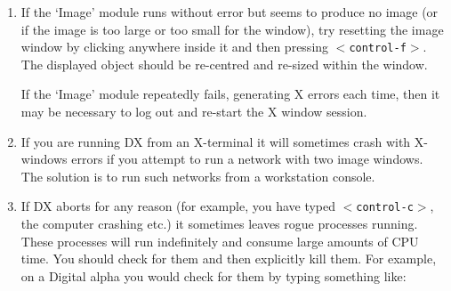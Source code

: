\begin{enumerate}
   where {\it x}\, is the amount of memory to be used, in Mb. Thus, for
   example, to specify a maximum of 200Mb you would type:

  \begin{quote}
   {\tt dx -memory 200}
  \end{quote}

   The most suitable value depends on the capabilities and configuration
   of your system. The following (possibly contradictory) criteria
   apply:

  \begin{itemize}

    \item try to allocate at least two or three times the total size
     of your data set,

    \item but do not allocate more than the total amount of swap space
     on your machine\footnotemark[\value{swapfoot}],

    \item finally (but not least), other users will appreciate your 
     setting a small value!

  \end{itemize}

   Appendix A, {\it Using Data Explorer: Some Useful Hints}, in the
   IBM {\it User's Guide}\cite{USERG} includes a section, {\it Memory
   Use}, which contains useful hints on reducing the amount of memory
   needed by DX.

  \item If the `Image' module runs without error but seems to produce no
   image (or if the image is too large or too small for the window), try
   resetting the image window by clicking anywhere inside it and then 
   pressing {\tt $<$control-f$>$}. The displayed object should be
   re-centred and re-sized within the window.

   If the `Image' module repeatedly fails, generating X errors each time, 
   then it may be necessary to log out and re-start the X window session.

  \item If you are running DX from an X-terminal it will sometimes
   crash with X-windows errors if you attempt to run a network with
   two image windows. The solution is to run such networks from a
   workstation console.

  \item If DX aborts for any reason (for example, you have typed
   {\tt $<$control-c$>$}, the computer crashing etc.) it sometimes leaves
   rogue processes running. These processes will run indefinitely and
   consume large amounts of CPU time.  You should check for them and then
   explicitly kill them. For example, on a Digital alpha you would check for
   them by typing something like:


\end{enumerate}
